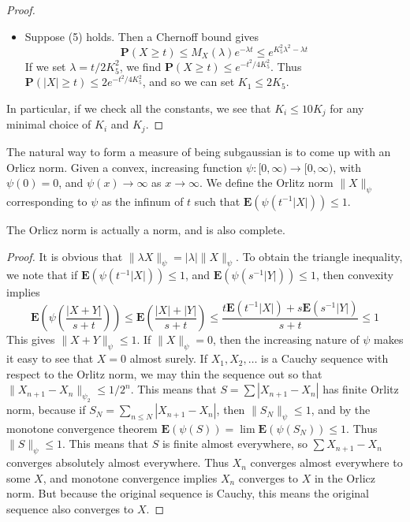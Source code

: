 \begin{proof}
\begin{itemize}
    \item Suppose (5) holds. Then a Chernoff bound gives
    \[ \mathbf{P}(X \geq t) \leq M_X(\lambda) e^{-\lambda t} \leq e^{K_5^2 \lambda^2 - \lambda t} \]
    If we set $\lambda = t/2K_5^2$, we find $\mathbf{P}(X \geq t) \leq e^{-t^2/4K_5^2}$. Thus $\mathbf{P}(|X| \geq t) \leq 2 e^{-t^2/4K_5^2}$, and so we can set $K_1 \leq 2K_5$.
\end{itemize}
%
In particular, if we check all the constants, we see that $K_i \leq 10K_j$ for any minimal choice of $K_i$ and $K_j$.
\end{proof}

The natural way to form a measure of being subgaussian is to come up with an Orlicz norm. Given a convex, increasing function $\psi:[0,\infty) \to [0,\infty)$, with $\psi(0) = 0$, and $\psi(x) \to \infty$ as $x \to \infty$. We define the Orlitz norm $\| X \|_\psi$ corresponding to $\psi$ as the infinum of $t$ such that $\mathbf{E}(\psi(t^{-1} |X|)) \leq 1$.

\begin{theorem}
    The Orlicz norm is actually a norm, and is also complete.
\end{theorem}
\begin{proof}
    It is obvious that $\| \lambda X \|_\psi = |\lambda| \| X \|_\psi$. To obtain the triangle inequality, we note that if $\mathbf{E}(\psi(t^{-1} |X|)) \leq 1$, and $\mathbf{E}(\psi(s^{-1} |Y|)) \leq 1$, then convexity implies
    \[ \mathbf{E} \left(\psi \left(\frac{|X + Y|}{s + t} \right) \right) \leq \mathbf{E} \left( \frac{|X| + |Y|}{s + t} \right) \leq \frac{t \mathbf{E}(t^{-1} |X|) + s \mathbf{E}(s^{-1} |Y|)}{s + t} \leq 1 \]
    This gives $\| X + Y \|_\psi \leq 1$. If $\| X \|_\psi = 0$, then the increasing nature of $\psi$ makes it easy to see that $X = 0$ almost surely. If $X_1, X_2, \dots$ is a Cauchy sequence with respect to the Orlitz norm, we may thin the sequence out so that $\| X_{n+1} - X_n \|_{\psi_2} \leq 1/2^n$. This means that $S = \sum |X_{n+1} - X_n|$ has finite Orlitz norm, because if $S_N = \sum_{n \leq N} |X_{n+1} - X_n|$, then $\| S_N \|_\psi \leq 1$, and by the monotone convergence theorem $\mathbf{E}(\psi(S)) = \lim \mathbf{E}(\psi(S_N)) \leq 1$. Thus $\| S \|_\psi \leq 1$. This means that $S$ is finite almost everywhere, so $\sum X_{n+1} - X_n$ converges absolutely almost everywhere. Thus $X_n$ converges almost everywhere to some $X$, and monotone convergence implies $X_n$ converges to $X$ in the Orlicz norm. But because the original sequence is Cauchy, this means the original sequence also converges to $X$.
\end{proof}

